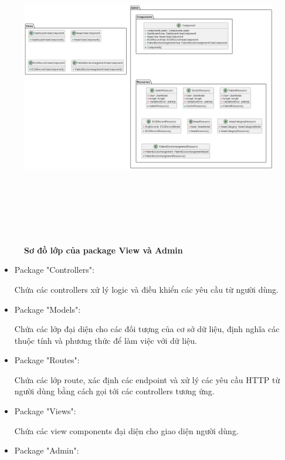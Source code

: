 \begin{enumerate}[a)]
\begin{figure}[H]
  \centering
  \includegraphics[width=15cm,height=14cm]{Images/server/class/class_admin.png}
  \caption[Sơ đồ lớp của package View và Admin]{\bfseries \fontsize{12pt}{0pt}\selectfont Sơ đồ lớp của package View và Admin}
  \label{class_admin} %
\end{figure}


\begin{itemize}

  \item Package "Controllers":

  Chứa các controllers xử lý logic và điều khiển các yêu cầu từ người dùng.
  \item Package "Models":
  
  Chứa các lớp đại diện cho các đối tượng của cơ sở dữ liệu, định nghĩa các thuộc tính và phương thức để làm việc với dữ liệu.
  \item Package "Routes":
  
  Chứa các lớp route, xác định các endpoint và xử lý các yêu cầu HTTP từ người dùng bằng cách gọi tới các controllers tương ứng.
  \item Package "Views":
  
  Chứa các view components đại diện cho giao diện người dùng.
  \item Package "Admin":
  

\end{itemize}
\end{enumerate}
